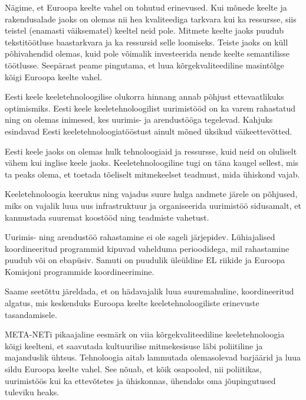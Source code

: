 \begin{multicols}{2}
Nägime, et Euroopa keelte vahel on tohutud erinevused.  Kui mõnede keelte ja rakendusalade jaoks on olemas nii hea kvaliteediga tarkvara kui ka ressursse, siis teistel (enamasti väiksematel) keeltel neid pole.  Mitmete keelte jaoks puudub tekstitöötluse baastarkvara ja ka ressursid selle loomiseks.  Teiste jaoks on küll põhivahendid olemas, kuid pole võimalik investeerida nende keelte semantilisse töötlusse.  Seepärast peame pingutama, et luua kõrgekvaliteediline masintõlge kõigi Euroopa keelte vahel.

Eesti keele keeletehnoloogilise olukorra hinnang annab põhjust ettevaatlikuks optimismiks.  Eesti keele keeletehnoloogilist uurimistööd on ka varem rahastatud ning on olemas inimesed, kes uurimis- ja arendustööga tegelevad.  Kahjuks esindavad Eesti keeletehnoloogiatööstust ainult mõned üksikud väikeettevõtted.
\columnbreak

Eesti keele jaoks on olemas hulk tehnoloogiaid ja ressursse, kuid neid on oluliselt vähem kui inglise keele jaoks.  Keeletehnoloogiline tugi on täna kaugel sellest, mis ta peaks olema, et toetada tõeliselt mitmekeelset teadmust, mida ühiskond vajab.

Keeletehnoloogia keerukus ning vajadus suure hulga andmete järele on põhjused, miks on vajalik luua uus infrastruktuur ja organiseerida uurimistöö sidusamalt, et kannustada suuremat koostööd ning teadmiste vahetust.

Uurimis- ning arendustöö rahastamine ei ole sageli järjepidev.  Lühiajalised koordineeritud programmid kipuvad vahelduma perioodidega, mil rahastamine puudub või on ebapüsiv.  Samuti on puudulik üleüldine EL riikide ja Euroopa Komisjoni programmide koordineerimine.

Saame seetõttu järeldada, et on hädavajalik luua suuremahuline, koordineeritud algatus, mis keskenduks Euroopa keelte keeletehnoloogiliste erinevuste tasandamisele.

META-NETi pikaajaline eesmärk on viia kõrgekvaliteediline keeletehnoloogia kõigi keelteni, et saavutada kultuurilise mitmekesisuse läbi poliitiline ja majanduslik ühtsus. 
Tehnoloogia aitab lammutada olemasolevad barjäärid ja luua sildu Euroopa keelte vahel. 
See nõuab, et kõik osapooled, nii poliitikas, uurimistöös kui ka ettevõtetes ja ühiskonnas, ühendaks oma jõupingutused tuleviku heaks.
\end{multicols}
\cleardoublepage


